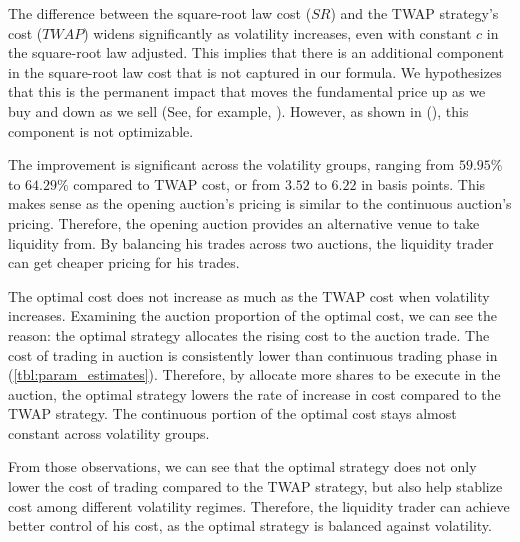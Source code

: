 The difference between the square-root law cost ($SR$) and the TWAP strategy's cost ($TWAP$) widens significantly as volatility increases, even with constant $c$ in the square-root law adjusted. This implies that there is an additional component in the square-root law cost that is not captured in our formula. We hypothesizes that this is the permanent impact that moves the fundamental price up as we buy and down as we sell (See, for example, \cite{Kyle1985}). However, as shown in (\cite{Almgren2000}), this component is not optimizable.

The improvement is significant across the volatility groups, ranging from $59.95 \%$ to $64.29 \%$ compared to TWAP cost, or from $3.52$ to $6.22$ in basis points. This makes sense as the opening auction's pricing is similar to the continuous auction's pricing. Therefore, the opening auction provides an alternative venue to take liquidity from. By balancing his trades across two auctions, the liquidity trader can get cheaper pricing for his trades.

The optimal cost does not increase as much as the TWAP cost when volatility increases. Examining the auction proportion of the optimal cost, we can see the reason: the optimal strategy allocates the rising cost to the auction trade. The cost of trading in auction is consistently lower than continuous trading phase in (\ref{tbl:param_estimates}). Therefore, by allocate more shares to be execute in the auction, the optimal strategy lowers the rate of increase in cost compared to the TWAP strategy. The continuous portion of the optimal cost stays almost constant across volatility groups.

From those observations, we can see that the optimal strategy does not only lower the cost of trading compared to the TWAP strategy, but also help stablize cost among different volatility regimes. Therefore, the liquidity trader can achieve better control of his cost, as the optimal strategy is balanced against volatility.

